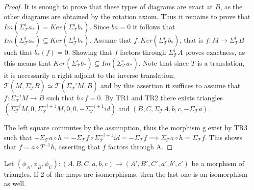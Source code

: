 \begin{proof}
        It is enough to prove that these types of diagrams are exact at $B$, as the other diagrams are obtained by the rotation axiom. Thus it remains to prove that $Im(\Sigma_{\mathcal{T}}^ia_*)=Ker(\Sigma_{\mathcal{T}}^ib_*)$. Since $ba=0$ it follows that $Im(\Sigma_{\mathcal{T}}^ia_*) \subseteq Ker(\Sigma_{\mathcal{T}}^ib_*)$. Assume that $f:Ker(\Sigma_{\mathcal{T}}^ib_*)$, that is $f:M\rightarrow \Sigma_{\mathcal{T}}^iB$ such that $b_*(f)=0$. Showing that $f$ factors through $\Sigma_{\mathcal{T}}^iA$ proves exactness, as this means that $Ker(\Sigma_{\mathcal{T}}^ib_*)\subseteq Im(\Sigma_{\mathcal{T}}^ia_*)$. Note that since $T$ is a translation, it is necessarily a right adjoint to the inverse translation; $\mathcal{T}(M,\Sigma_{\mathcal{T}}^iB) \simeq\mathcal{T}(\Sigma_{\mathcal{T}}^{-i}M,B)$ and by this assertion it suffices to assume that $f:\Sigma_{\mathcal{T}}^{-i}M\rightarrow B$ such that $b\circ f = 0$. By TR1 and TR2 there exists triangles $(\Sigma_{\mathcal{T}}^{-i}M,0,\Sigma_{\mathcal{T}}^{-i+1}M,0,0,-\Sigma_{\mathcal{T}}^{-i+1}id)$ and $(B,C,\Sigma_{\mathcal{T}}A,b,c,-\Sigma_{\mathcal{T}}a)$. 
        \begin{center}
        \end{center}
        The left square commutes by the assumption, thus the morphism g exist by TR3 such that $-\Sigma_{\mathcal{T}}a\circ h = -\Sigma_{\mathcal{T}}f\circ \Sigma_{\mathcal{T}}^{-i+1}id = -\Sigma_{\mathcal{T}}f \implies \Sigma_{\mathcal{T}}a\circ h = \Sigma_{\mathcal{T}}f$. This shows that $f = a\circ T^{-1}h$, asserting that $f$ factors through A.
    \end{proof}
    \begin{lemma}
        Let $(\phi_A, \phi_B, \phi_C):(A,B,C,a,b,c) \rightarrow (A',B',C',a',b',c')$ be a morphism of triangles. If 2 of the maps are isomorphisms, then the last one is an isomorphism as well.
        \begin{center}
        \end{center}
    \end{lemma}

